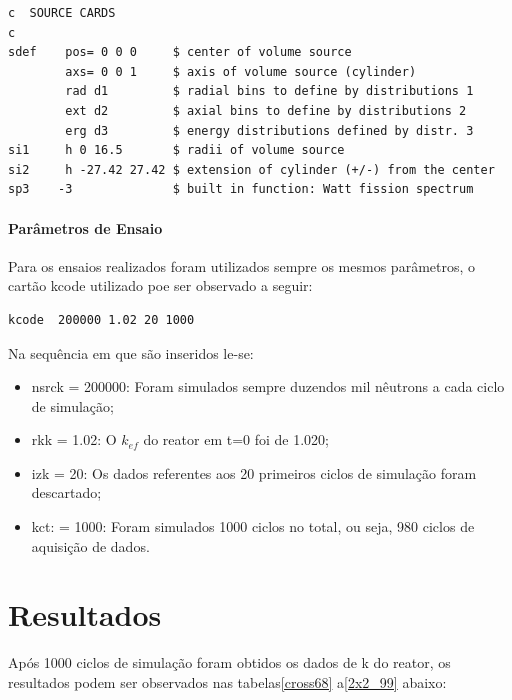 \documentclass[
	12pt,				%
	openany,			%
	twoside,			%
	a4paper,			%
	english,			%
	french,				%
	spanish,			%
	brazil				%
	]{abntex2}
\begin{document}
\begin{lstlisting}
c  SOURCE CARDS 
c  
sdef    pos= 0 0 0     $ center of volume source          
        axs= 0 0 1     $ axis of volume source (cylinder)          
        rad d1         $ radial bins to define by distributions 1          
        ext d2         $ axial bins to define by distributions 2          
        erg d3         $ energy distributions defined by distr. 3  
si1     h 0 16.5       $ radii of volume source  
si2     h -27.42 27.42 $ extension of cylinder (+/-) from the center  
sp3    -3              $ built in function: Watt fission spectrum
\end{lstlisting}

\newpage
\subsection{Parâmetros de Ensaio}

Para os ensaios realizados foram utilizados sempre os mesmos parâmetros,
o cartão kcode utilizado poe ser observado a seguir:

\begin{lstlisting}
kcode  200000 1.02 20 1000
\end{lstlisting}

Na sequência em que são inseridos le-se:
\begin{itemize}
\item nsrck = 200000: Foram simulados sempre duzendos mil nêutrons a cada
ciclo de simulação;
\item rkk = 1.02: O $k_{ef}$ do reator em t=0 foi de 1.020;
\item izk = 20: Os dados referentes aos 20 primeiros ciclos de simulação
foram descartado;
\item kct: = 1000: Foram simulados 1000 ciclos no total, ou seja, 980 ciclos
de aquisição de dados.
\end{itemize}

\part*{Resultados}

Após 1000 ciclos de simulação foram obtidos os dados de k do reator,
os resultados podem ser observados nas tabelas\ref{cross68} a\ref{2x2_99} abaixo:
\end{document}
